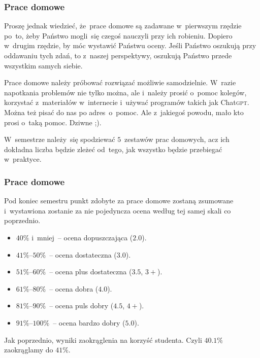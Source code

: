 \documentclass[10pt,t]{beamer}
\begin{document}
\begin{frame}
  \frametitle{Prace domowe}


  Proszę jednak wiedzieć, że~prace domowe są zadawane w~pierwszym rzędzie
  po~to, żeby Państwo mogli~się czegoś nauczyli przy ich robieniu. Dopiero
  w~drugim rzędzie, by móc wystawić Państwu oceny. Jeśli Państwo oszukują
  przy oddawaniu tych zdań, to z~naszej perspektywy, oszukują Państwo przede
  wszystkim samych siebie.

  Prace domowe należy próbować rozwiązać możliwie samodzielnie. W~razie
  napotkania problemów nie tylko można,
  ale i~\alert{należy} prosić o~pomoc kolegów, korzystać z~materiałów
  w~internecie i~używać programów takich jak Chat\textsc{gpt}. Można też
  pisać do nas po adres~\email o~pomoc. Ale z~jakiegoś powodu, mało kto
  prosi o~taką pomoc. Dziwne ;).

  W~semestrze należy~się spodziewać $5$~zestawów prac domowych, acz ich
  dokładna liczba będzie zleżeć od~tego, jak wszystko będzie przebiegać
  w~praktyce.

\end{frame}





\begin{frame}
  \frametitle{Prace domowe}


  Pod koniec semestru punkt zdobyte za prace domowe zostaną zsumowane
  i~wystawiona zostanie za nie \alert{pojedyncza} ocena według tej samej
  skali co poprzednio.

  \begin{itemize}

  \item $40\%$ i~mniej~-- ocena dopuszczająca ($2.0$).

  \item $41\%\text{--}50\%$~-- ocena dostateczna ($3.0$).

  \item $51\%\text{--}60\%$~-- ocena plus dostateczna ($3.5$, $3+$).

  \item $61\%\text{--}80\%$~-- ocena dobra ($4.0$).

  \item $81\%\text{--}90\%$~-- ocena puls dobry ($4.5$, $4+$).

  \item $91\%\text{--}100\%$~-- ocena bardzo dobry ($5.0$).

  \end{itemize}

  Jak poprzednio, wyniki zaokrąglenia na korzyść studenta. Czyli $40.1\%$
  zaokrąglamy do $41\%$.

\end{frame}
\end{document}
